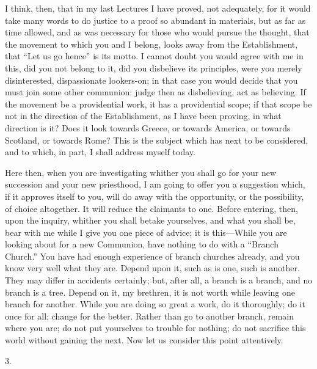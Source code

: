 I think, then, that in my last Lectures I have proved, not
adequately, for it would take many words to do justice to a proof so
abundant in materials, but as far as time allowed, and as was
necessary for those who would pursue the thought, that the movement to
which you and I belong, looks away from the Establishment, that
``Let us go hence'' is its motto. I cannot doubt you would
agree with me in this, did you not belong to it, did you disbelieve
its principles, were you merely disinterested, dispassionate
lookers-on; in that case you would decide that you must join some
other communion: judge then as disbelieving, act as believing. If the
movement be a providential work, it has a providential scope; if that
scope be not in the direction of the Establishment, as I have been
proving, in what direction is it? Does it look towards Greece, or
towards America, or towards Scotland, or towards Rome? This is the
subject which has next to be considered, and to which, in part, I
shall address myself today.

Here then, when you are investigating whither you shall go for your
new succession and your new priesthood, I am going to offer you a
suggestion which, if it approves itself to you, will do away with the
opportunity, or the possibility, of choice altogether. It will reduce
the claimants to one. Before entering, then, upon the inquiry, whither
you shall betake yourselves, and what you shall be, bear with me while
I give you one piece of advice; it is this—While you are looking
about for a new Communion, have nothing to do with a ``Branch
Church.'' You have had enough experience of branch churches
already, and you know very well what they are. Depend upon it, such as
is one, such is another. They may differ in accidents certainly; but,
after all, a branch is a branch, and no branch is a tree. Depend on
it, my brethren, it is not worth while leaving one branch for another.
While you are doing so great a work, do it thoroughly; do it once for
all; change for the better. Rather than go to another branch, remain
where you are; do not put yourselves to trouble for nothing; do not
sacrifice this world without gaining the next. Now let us consider
this point attentively.

3.

